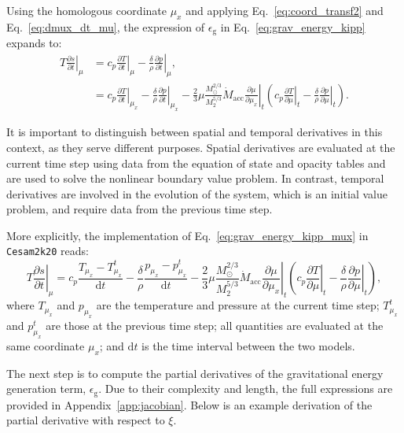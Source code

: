 \documentclass[12pt,a4paper]{article}
\newcommand{\mr}{\mathrm}
\newcommand{\pfird}[2][]{\frac{\partial#1}{\partial#2}}
\newcommand{\dd}[1]{\mathrm{d}#1}
\begin{document}
Using the homologous coordinate $\mu_x$ and applying Eq.~\eqref{eq:coord_transf2} and Eq.~\eqref{eq:dmux_dt_mu}, the expression of $\epsilon_\mr{g}$ in Eq.~\eqref{eq:grav_energy_kipp} expands to:
\begin{align}
  T\left.\pfird[s]{t}\right|_\mu &= c_p\left.\pfird[T]{t}\right|_\mu - \frac{\delta}{\rho}\left.\pfird[p]{t}\right|_\mu, \nonumber\\
  &= c_p\left.\pfird[T]{t}\right|_{\mu_x} - \frac{\delta}{\rho}\left.\pfird[p]{t}\right|_{\mu_x} - 
  \frac{2}{3}\mu\frac{M_\odot^{2/3}}{M_2^{5/3}}\dot{M}_\mr{acc}\left.\pfird[\mu]{\mu_x}\right|_t\left(c_p\left.\pfird[T]{\mu}\right|_t - \frac{\delta}{\rho}\left.\pfird[p]{\mu}\right|_t\right). \label{eq:grav_energy_kipp_mux}
\end{align}

It is important to distinguish between spatial and temporal derivatives in this context, as they serve different purposes. Spatial derivatives are evaluated at the current time step using data from the equation of state and opacity tables and are used to solve the nonlinear boundary value problem. In contrast, temporal derivatives are involved in the evolution of the system, which is an initial value problem, and require data from the previous time step.

More explicitly, the implementation of Eq.~\eqref{eq:grav_energy_kipp_mux} in \texttt{Cesam2k20} reads:
\begin{equation}
  T\left.\pfird[s]{t}\right|_\mu = c_p\frac{T_{\mu_x} - T_{\mu_x}^t}{\dd{t}} - \frac{\delta}{\rho}\frac{p_{\mu_x} - p_{\mu_x}^t}{\dd{t}} - \frac{2}{3}\mu\frac{M_\odot^{2/3}}{M_2^{5/3}}\dot{M}_\mr{acc}\left.\pfird[\mu]{\mu_x}\right|_t\left(c_p\left.\pfird[T]{\mu}\right|_t - \frac{\delta}{\rho}\left.\pfird[p]{\mu}\right|_t\right),
\end{equation}
where $T_{\mu_x}$ and $p_{\mu_x}$ are the temperature and pressure at the current time step; $T_{\mu_x}^t$ and $p_{\mu_x}^t$ are those at the previous time step; all quantities are evaluated at the same coordinate $\mu_x$; and $\dd{t}$ is the time interval between the two models. 

The next step is to compute the partial derivatives of the gravitational energy generation term, $\epsilon_\mr{g}$. Due to their complexity and length, the full expressions are provided in Appendix~\ref{app:jacobian}. Below is an example derivation of the partial derivative with respect to $\xi$.
\end{document}
